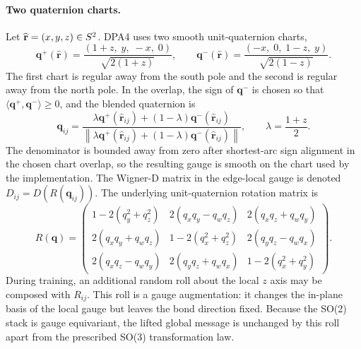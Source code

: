 \paragraph{Two quaternion charts.}
Let $\widehat{\mathbf{r}}=(x,y,z)\in S^2$.
DPA4 uses two smooth unit-quaternion
charts,
\begin{equation}
    \mathbf{q}^{+}(\widehat{\mathbf{r}})
    =
    \frac{(1+z,\;y,\;-x,\;0)}{\sqrt{2(1+z)}},
    \qquad
    \mathbf{q}^{-}(\widehat{\mathbf{r}})
    =
    \frac{(-x,\;0,\;1-z,\;y)}{\sqrt{2(1-z)}}.
    \label{eq:sm-quaternion-charts}
\end{equation}
The first chart is regular away from the south pole and the second is regular away from the north pole.
In the overlap, the sign of $\mathbf{q}^{-}$ is chosen
so that $\langle\mathbf{q}^{+},\mathbf{q}^{-}\rangle\ge 0$, and the blended
quaternion is
\begin{equation}
    \mathbf{q}_{ij}
    =
    \frac{\lambda\mathbf{q}^{+}(\widehat{\mathbf{r}}_{ij})
        +(1-\lambda)\mathbf{q}^{-}(\widehat{\mathbf{r}}_{ij})}
    {\left\|\lambda\mathbf{q}^{+}(\widehat{\mathbf{r}}_{ij})
        +(1-\lambda)\mathbf{q}^{-}(\widehat{\mathbf{r}}_{ij})\right\|},
    \qquad
    \lambda=\frac{1+z}{2}.
    \label{eq:sm-quaternion-blend}
\end{equation}
The denominator is bounded away from zero after shortest-arc sign alignment in the chosen chart overlap, so the resulting gauge is smooth on the chart used by the implementation.
The Wigner-D matrix in the edge-local gauge is denoted $D_{ij}=D(R(\mathbf{q}_{ij}))$.
The underlying unit-quaternion rotation matrix is
\begin{equation}
    R(\mathbf{q})=
    \begin{pmatrix}
        1-2(q_y^2+q_z^2) & 2(q_xq_y-q_wq_z) & 2(q_xq_z+q_wq_y) \\
        2(q_xq_y+q_wq_z) & 1-2(q_x^2+q_z^2) & 2(q_yq_z-q_wq_x) \\
        2(q_xq_z-q_wq_y) & 2(q_yq_z+q_wq_x) & 1-2(q_x^2+q_y^2)
    \end{pmatrix}.
    \label{eq:sm-quaternion-rotation}
\end{equation}
During training, an additional random roll about the local $z$ axis may be composed with $R_{ij}$.
This roll is a gauge augmentation: it changes the in-plane basis of the local gauge but leaves the bond direction fixed.
Because the SO(2) stack is gauge equivariant, the lifted global message is unchanged by this roll apart from the prescribed SO(3) transformation law.

